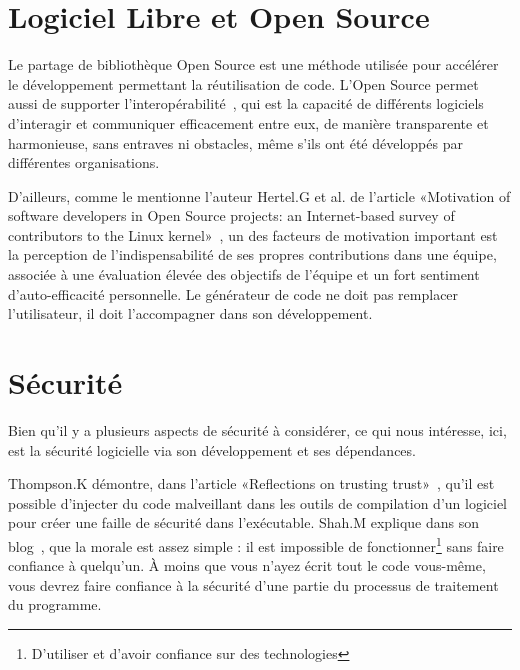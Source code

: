 \section{Logiciel Libre et Open Source}

Le partage de bibliothèque Open Source est une méthode utilisée pour accélérer le développement permettant la réutilisation de code. L’Open Source permet aussi de supporter l'interopérabilité~\cite{open_interop_2011}, qui est la capacité de différents logiciels d'interagir et communiquer efficacement entre eux, de manière transparente et harmonieuse, sans entraves ni obstacles, même s’ils ont été développés par différentes organisations.

D'ailleurs, comme le mentionne l'auteur Hertel.G et al. de l'article «Motivation of software developers in Open Source projects: an Internet-based survey of contributors to the Linux kernel»~\cite{HERTEL20031159}, un des facteurs de motivation important est la perception de l'indispensabilité de ses propres contributions dans une équipe, associée à une évaluation élevée des objectifs de l'équipe et un fort sentiment d'auto-efficacité personnelle. Le générateur de code ne doit pas remplacer l'utilisateur, il doit l'accompagner dans son développement.



\section{Sécurité}

Bien qu'il y a plusieurs aspects de sécurité à considérer, ce qui nous intéresse, ici, est la sécurité logicielle via son développement et ses dépendances.

Thompson.K démontre, dans l'article «Reflections on trusting trust»~\cite{thompson_trusting_1984}, qu'il est possible d'injecter du code malveillant dans les outils de compilation d'un logiciel pour créer une faille de sécurité dans l'exécutable. Shah.M explique dans son blog~\cite{discussion_reflection_trusting_2020}, que la morale est assez simple : il est impossible de fonctionner\footnote{D'utiliser et d'avoir confiance sur des technologies} sans faire confiance à quelqu'un. À moins que vous n'ayez écrit tout le code vous-même, vous devrez faire confiance à la sécurité d'une partie du processus de traitement du programme.

